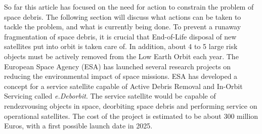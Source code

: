 \documentclass[a4paper]{article}
\begin{document}
So far this article has focused on the need for action to constrain the problem of space debris. The following section will discuss what actions can be taken to tackle the problem, and what is currently being done. To prevent a runaway fragmentation of space debris, it is crucial that End-of-Life disposal of new satellites put into orbit is taken care of. In addition, about 4 to 5 large risk objects must be actively removed from the Low Earth Orbit each year\cite{ESA_about_space_debris}. The European Space Agency (ESA) has launched several research projects on reducing the environmental impact of space missions. ESA has developed a concept for a service satellite capable of Active Debris Removal and In-Orbit Servicing called \textit{e.Deborbit}. The service satellite would be capable of rendezvousing objects in space, deorbiting space debris and performing service on operational satellites. The cost of the project is estimated to be about 300 million Euros, with a first possible launch date in 2025\cite{eDeorbit_cost}.




\end{document}

